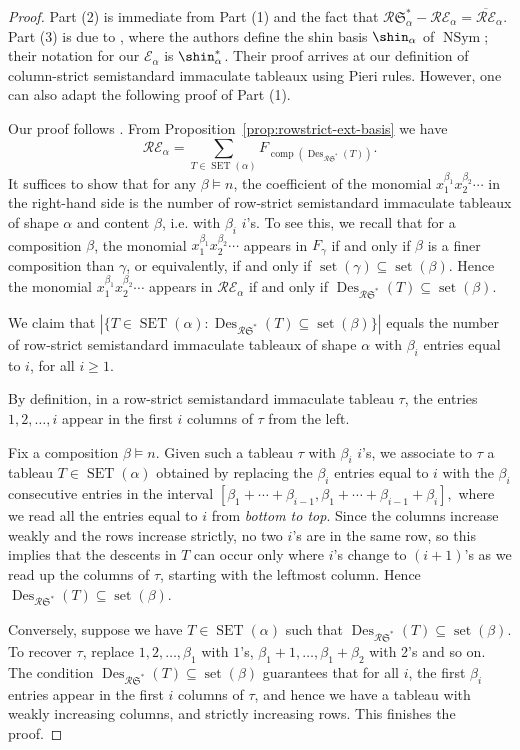 \documentclass[12pt,letterpaper]{amsart}
\theoremstyle{definition}
\DeclareMathOperator{\comp}{comp}
\DeclareMathOperator{\set}{set}
\newcommand{\rdI}{\mathcal{R}\mathfrak{S}^*}
\DeclareMathOperator{\Des}{Des}
\newcommand{\SET}{\ensuremath{\operatorname{SET}}} \newcommand{\NSET}{\ensuremath{\operatorname{NSET}}}\newcommand{\SRCT}{\ensuremath{\operatorname{SRCT}}}
\newcommand{\Nsym}{\ensuremath{\operatorname{NSym}}}
\begin{document}
\begin{proof}  Part (2) is immediate from Part (1) and the fact that $\rdI_\alpha-\mathcal{R}\mathcal{E}_\alpha=\overline{\mathcal{R}{\mathcal{E}}}_{\alpha}$.
Part (3) is due to \cite{CFLSX2014}, where the authors define the shin basis $\shin_\alpha$ of $\Nsym$; their notation for our 
 $\mathcal{E}_\alpha$ is $\shin^*_\alpha$.  Their proof arrives at our definition of column-strict semistandard immaculate tableaux using Pieri rules.  However, one can also adapt the following  proof of Part (1).

Our proof follows \cite[Ex.~7.90(a)]{RPSEC21999}. From Proposition~\ref{prop:rowstrict-ext-basis} we have 
\[\mathcal{R}\mathcal{E}_\alpha=\sum_{T\in\SET(\alpha)} F_{\comp(\Des_{\rdI}(T))}  .\] 
It suffices to show that for any $\beta\vDash n$, the coefficient of the monomial $x_1^{\beta_1}x_2^{\beta_2}\cdots$  in the right-hand side is the number of row-strict semistandard immaculate tableaux of shape $\alpha$ and content $\beta$, i.e. with $\beta_i$ $i$'s.
To see this, we recall \cite{LMvW2013} that for a composition $\beta$, the  monomial $x_1^{\beta_1}x_2^{\beta_2}\cdots$ appears in $F_\gamma$ if and only if $\beta$ is a finer composition than $\gamma$, or equivalently, if and only if $\set(\gamma)\subseteq \set(\beta)$.  Hence the monomial $x_1^{\beta_1}x_2^{\beta_2}\cdots$ appears in $\mathcal{R}\mathcal{E}_\alpha$  if and only if $\Des_{\rdI}(T)\subseteq \set(\beta).$

We claim that 
$|\{T\in \SET(\alpha): \Des_{\rdI}(T)\subseteq \set(\beta)\}|$
equals the number of  row-strict semistandard immaculate tableaux of shape $\alpha$ with $\beta_i$ entries equal to $i$, for all $i\ge 1$.

By definition, in a   row-strict semistandard immaculate tableau $\tau$, the entries $1,2,\ldots,i$ appear in the first $i$ columns of $\tau$ from the left. 

Fix a composition $\beta\vDash n$.
Given such a tableau $\tau$ with $\beta_i$ $i$'s,  we associate to $\tau$ a tableau $T\in \SET(\alpha)$ obtained by replacing the $\beta_i$ entries equal to $i$ with the $\beta_i$ consecutive entries in the interval $[\beta_1+\cdots+\beta_{i-1}, \beta_1+\cdots+\beta_{i-1}+\beta_i],$ where we read all the entries equal to $i$ from \textit{bottom to top}.   Since the columns increase weakly and the rows increase strictly, no two $i$'s are in the same row, so this implies that the descents in $T$ can occur only where $i$'s change to $(i+1)$'s as we read up the columns of $\tau$, starting with the leftmost column.  Hence  
$\Des_{\rdI}(T)\subseteq \set(\beta)$.

Conversely, suppose we have $T\in \SET(\alpha)$ such that $\Des_{\rdI}(T)\subseteq \set(\beta)$.  To recover $\tau$, replace $1,2,\ldots ,\beta_1$ with $1$'s, $\beta_1+1,\ldots ,\beta_1+\beta_2$ with 2's and so on.  The condition $\Des_{\rdI}(T)\subseteq \set(\beta)$ guarantees that for all $i$, the first $\beta_i$ entries appear in the first $i$ columns of $\tau$, and hence we have a tableau  with weakly increasing columns, and strictly increasing rows.  This finishes the proof.
\end{proof}
\end{document}
